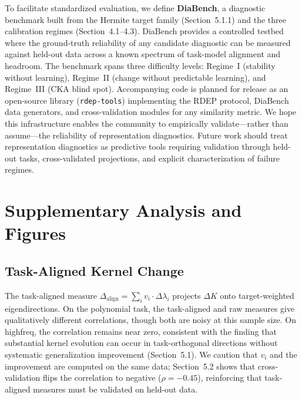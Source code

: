 \documentclass[10pt]{article}
\begin{document}
To facilitate standardized evaluation, we define \textbf{DiaBench}, a diagnostic benchmark built from the Hermite target family (Section~5.1.1) and the three calibration regimes (Section~4.1--4.3). DiaBench provides a controlled testbed where the ground-truth reliability of any candidate diagnostic can be measured against held-out data across a known spectrum of task-model alignment and headroom. The benchmark spans three difficulty levels: Regime~I (stability without learning), Regime~II (change without predictable learning), and Regime~III (CKA blind spot). Accompanying code is planned for release as an open-source library (\texttt{rdep-tools}) implementing the RDEP protocol, DiaBench data generators, and cross-validation modules for any similarity metric. We hope this infrastructure enables the community to empirically validate---rather than assume---the reliability of representation diagnostics. Future work should treat representation diagnostics as predictive tools requiring validation through held-out tasks, cross-validated projections, and explicit characterization of failure regimes.





\appendix
\setcounter{figure}{0}
\setcounter{table}{0}
\renewcommand{\thefigure}{S\arabic{figure}}
\renewcommand{\thetable}{S\arabic{table}}
\section{Supplementary Analysis and Figures}

\subsection*{Task-Aligned Kernel Change}
\label{sec:task-aligned}
The task-aligned measure $\Delta_{\text{align}} = \sum_i v_i \cdot \Delta\lambda_i$ projects $\Delta K$ onto target-weighted eigendirections. On the polynomial task, the task-aligned and raw measures give qualitatively different correlations, though both are noisy at this sample size. On highfreq, the correlation remains near zero, consistent with the finding that substantial kernel evolution can occur in task-orthogonal directions without systematic generalization improvement (Section~5.1). We caution that $v_i$ and the improvement are computed on the same data; Section~5.2 shows that cross-validation flips the correlation to negative ($\rho=-0.45$), reinforcing that task-aligned measures must be validated on held-out data.
\end{document}
